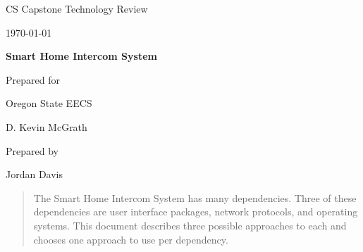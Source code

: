 \documentclass[onecolumn, draftclsnofoot,10pt, compsoc]{IEEEtran}
\def \CapstoneTeamName{		Team 25}
\def \CapstoneTeamNumber{		25}
\def \GroupMemberOne{			Lazar Sharipoff}
\def \GroupMemberTwo{			Jordan Davis}
\def \GroupMemberThree{			Glen Anderson}
\def \CapstoneProjectName{		Smart Home Intercom System}
\def \CapstoneSponsorCompany{	Oregon State EECS}
\def \CapstoneSponsorPerson{		D. Kevin McGrath}
\def \DocType{		%
				Technology Review
				}
\newcommand{\NameSigPair}[1]{\par
\makebox[2.75in][r]{#1} \hfil 	\makebox[3.25in]{\makebox[2.25in]{\hrulefill} \hfill		\makebox[.75in]{\hrulefill}}
\par\vspace{-12pt} \textit{\tiny\noindent
\makebox[2.75in]{} \hfil		\makebox[3.25in]{\makebox[2.25in][r]{Signature} \hfill	\makebox[.75in][r]{Date}}}}
\renewcommand{\NameSigPair}[1]{#1}
\begin{document}
\begin{titlepage}
    \begin{singlespace}
        \hfill 
        \par\vspace{.2in}
        \centering
        \scshape{
            \huge CS Capstone \DocType \par
            {\large\today}\par
            \vspace{.5in}
            \textbf{\Huge\CapstoneProjectName}\par
            \vfill
            {\large Prepared for}\par
            \Huge \CapstoneSponsorCompany\par
            \vspace{5pt}
            {\Large\NameSigPair{\CapstoneSponsorPerson}\par}
            {\large Prepared by }\par
            \vspace{5pt}
            {\Large
                \NameSigPair{\GroupMemberTwo}\par
            }
            \vspace{20pt}
        }
        \begin{abstract}
        	The Smart Home Intercom System has many dependencies. Three of these dependencies are user interface packages, network protocols, and operating systems. This document describes three possible approaches to each and chooses one approach to use per dependency.  
        \end{abstract}     
    \end{singlespace}
\end{titlepage}
\newpage
{}
\tableofcontents
\clearpage
\end{document}
